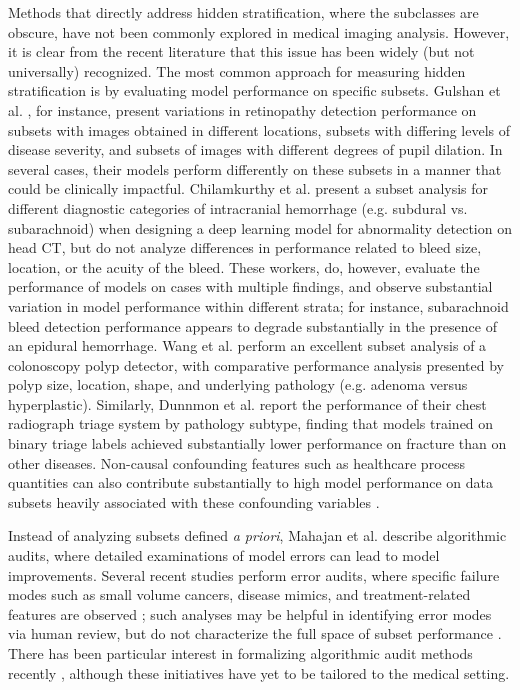\documentclass[sigconf]{acmart}
\begin{document}
Methods that directly address hidden stratification, where the subclasses are obscure, have not been commonly explored in medical imaging analysis.  
However, it is clear from the recent literature that this issue has been widely (but not universally) recognized.  
The most common approach for measuring hidden stratification is by evaluating model performance on specific subsets.
Gulshan et al. \citep{Gulshan2016-we}, for instance, present variations in retinopathy detection performance on subsets with images obtained in different locations, subsets with differing levels of disease severity, and subsets of images with different degrees of pupil dilation.  
In several cases, their models perform differently on these subsets in a manner that could be clinically impactful.  
Chilamkurthy et al. \citep{Chilamkurthy2018-op}  present a subset analysis for different diagnostic categories of intracranial hemorrhage (e.g. subdural vs. subarachnoid) when designing a deep learning model for abnormality detection on head CT, but do not analyze differences in  performance related to bleed size, location, or the acuity of the bleed. 
 These workers, do, however, evaluate the performance of models on cases with multiple findings, and observe substantial variation in model performance within different strata; for instance, subarachnoid bleed detection performance appears to degrade substantially in the presence of an epidural hemorrhage.  
Wang et al. \citep{Wang2019-jr} perform an excellent subset analysis of a colonoscopy polyp detector, with comparative performance analysis presented by polyp size, location, shape, and underlying pathology (e.g. adenoma versus hyperplastic).  
 Similarly, Dunnmon et al. \citep{Dunnmon2019-rr} report the performance of their chest radiograph triage system by pathology subtype, finding that models trained on binary triage labels achieved substantially lower performance on fracture than on other diseases.   
Non-causal confounding features such as healthcare process quantities can also contribute substantially to high model performance on data subsets heavily associated with these confounding variables \citep{Winkler2019-fw, Badgeley2019-zi, Agniel2018-qp, Zech2018-xq}.

Instead of analyzing subsets defined \textit{a priori}, Mahajan et al. \citep{Mahajan2019-yi} describe algorithmic audits, where detailed examinations of model errors can lead to model improvements.
 Several recent studies perform error audits, where specific failure modes such as small volume cancers, disease mimics, and treatment-related features are observed \citep{Campanella2019-qs, Wang2019-jr}; such analyses may be helpful in identifying error modes via human review, but do not characterize the full space of subset performance \citep{Selbst2017-gz}.  
 There has been particular interest in formalizing algorithmic audit methods recently \citep{raji2020closing}, although these initiatives have yet to be tailored to the medical setting. 
\end{document}
